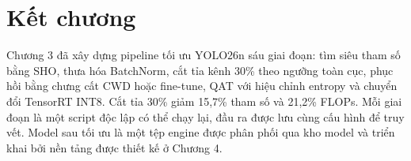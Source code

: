 \section{Kết chương}

Chương 3 đã xây dựng pipeline tối ưu YOLO26n sáu giai đoạn: tìm siêu tham số
bằng SHO, thưa hóa BatchNorm, cắt tỉa kênh 30\% theo ngưỡng toàn cục, phục hồi
bằng chưng cất CWD hoặc fine-tune, QAT với hiệu chỉnh entropy và chuyển đổi
TensorRT INT8. Cắt tỉa 30\% giảm 15,7\% tham số và 21,2\% FLOPs. Mỗi giai đoạn là
một script độc lập có thể chạy lại, đầu ra được lưu cùng cấu hình để truy vết.
Model sau tối ưu là một tệp engine được phân phối qua kho model và triển khai bởi
nền tảng được thiết kế ở Chương 4.
